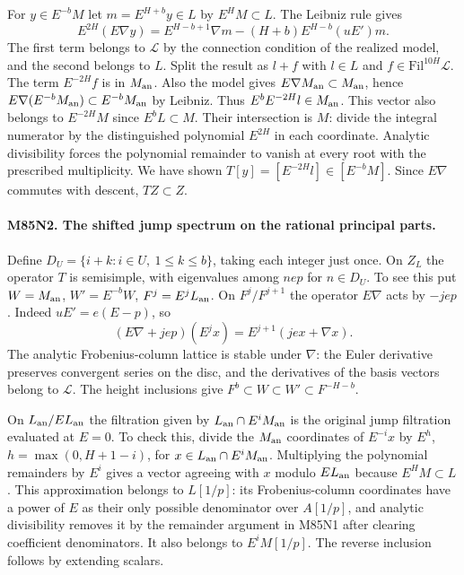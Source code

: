 For $y\in E^{-b}M$ let $m=E^{H+b}y\in L$ by $E^H M\subset L$.
The Leibniz rule gives
\[
 E^{2H}(E\nabla y)
   =E^{H-b+1}\nabla m-(H+b)E^{H-b}(uE')m .
\]
The first term belongs to $\mathcal L$ by the connection condition
of the realized model, and the second belongs to $L$.
Split the result as $l+f$ with $l\in L$ and
$f\in\mathrm{Fil}^{10H}\mathcal L$. The term $E^{-2H}f$ is
in $M_{\rm an}$. Also the model gives
$E\nabla M_{\rm an}\subset M_{\rm an}$, hence
$E\nabla(E^{-b}M_{\rm an})\subset E^{-b}M_{\rm an}$ by Leibniz.
Thus $E^bE^{-2H}l\in M_{\rm an}$. This vector also belongs to
$E^{-2H}M$ since $E^bL\subset M$. Their intersection is $M$:
divide the integral numerator by the distinguished polynomial
$E^{2H}$ in each coordinate. Analytic divisibility forces the
polynomial remainder to vanish at every root with the prescribed
multiplicity. We have shown $T[y]=[E^{-2H}l]\in [E^{-b}M]$.
Since $E\nabla$ commutes with descent, $TZ\subset Z$.

\paragraph{M85N2. The shifted jump spectrum on the rational principal parts.}
Define $D_U=\{i+k:i\in U,\ 1\le k\le b\}$, taking each
integer just once. On $Z_L$ the operator $T$ is semisimple,
with eigenvalues among $nep$ for $n\in D_U$.
To see this put $W=M_{\rm an}$,
$W'=E^{-b}W$, $F^j=E^jL_{\rm an}$. On $F^j/F^{j+1}$ the
operator $E\nabla$ acts by $-jep$. Indeed $uE'=e(E-p)$, so
\[
 (E\nabla+jep)(E^j x)=E^{j+1}(je x+\nabla x).
\]
The analytic Frobenius-column lattice is stable under $\nabla$:
the Euler derivative preserves convergent series on the disc,
and the derivatives of the basis vectors belong to $\mathcal L$.
The height inclusions give $F^b\subset W\subset W'\subset
F^{-H-b}$.

On $L_{\rm an}/E L_{\rm an}$ the filtration given by
$L_{\rm an}\cap E^i M_{\rm an}$ is the original jump
filtration evaluated at $E=0$. To check this, divide the $M_{\rm an}$
coordinates of $E^{-i}x$ by $E^h$, $h=\max(0,H+1-i)$, for
$x\in L_{\rm an}\cap E^iM_{\rm an}$. Multiplying the polynomial
remainders by $E^i$ gives a vector agreeing with $x$ modulo
$E L_{\rm an}$ because $E^H M\subset L$. This approximation
belongs to $L[1/p]$: its Frobenius-column coordinates have a power
of $E$ as their only possible denominator over $A[1/p]$, and
analytic divisibility removes it by the remainder argument in M85N1
after clearing coefficient denominators. It also belongs to
$E^iM[1/p]$. The reverse inclusion follows by extending scalars.

